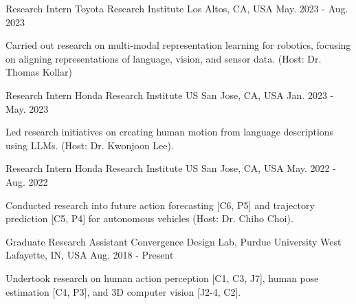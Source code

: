 


\begin{cventries}

\cventry
{Research Intern} %
{Toyota Research Institute} %
{Los Altos, CA, USA} %
{May. 2023 - Aug. 2023} %
{ %
\begin{cvitems}
    \item {Carried out research on multi-modal representation learning for robotics, focusing on aligning representations of language, vision, and sensor data. (Host: Dr. Thomas Kollar)}
\end{cvitems}
}
\vspace{-.5em}


\cventry
{Research Intern} %
{Honda Research Institute US} %
{San Jose, CA, USA} %
{Jan. 2023 - May. 2023} %
{ %
\begin{cvitems}
\item {Led research initiatives on creating human motion from language descriptions using LLMs. (Host: Dr. Kwonjoon Lee).}
\end{cvitems}
}
\vspace{-.5em}

\cventry
{Research Intern} %
{Honda Research Institute US} %
{San Jose, CA, USA} %
{May. 2022 - Aug. 2022} %
{ %
\begin{cvitems}
\item {Conducted research into future action forecasting [C6, P5] and trajectory prediction [C5, P4] for autonomous vehicles (Host: Dr. Chiho Choi).}
\end{cvitems}
}
\vspace{-.5em}

\cventry
{Graduate Research Assistant} %
{Convergence Design Lab, Purdue University} %
{West Lafayette, IN, USA} %
{Aug. 2018 - Present} %
{ %
\begin{cvitems}
\item {Undertook research on human action perception [C1, C3, J7], human pose estimation [C4, P3], and 3D computer vision [J2-4, C2].}
\end{cvitems}
}
\vspace{-.5em}


\end{cventries}
